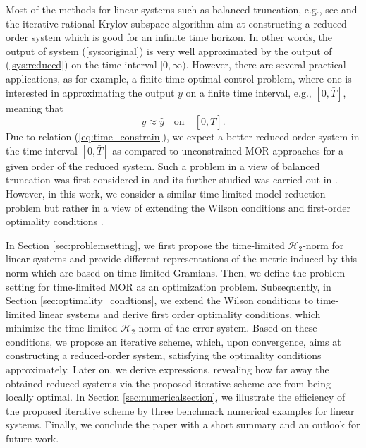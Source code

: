 \documentclass[a4paper,11pt, twoside]{article}
\begin{document}
Most of the methods for linear systems such as balanced truncation, e.g., see \cite{morAnt05, morMoo81} and the iterative rational Krylov subspace 
algorithm \cite{morGugAB08} aim at constructing a reduced-order system which is good for an infinite time horizon. In other words, the output 
of system (\ref{sys:original}) is very well approximated by the output of (\ref{sys:reduced}) on the time interval $[0,\infty)$. 
However, there are several practical applications, as for example, a 
finite-time optimal control problem, where one is interested in approximating the output $y$ on a finite time interval, e.g., $[0,\bar T]$, meaning 
that \begin{equation}\label{eq:time_constrain}
y \approx \hat y\quad \text{on} \quad [0,\bar T].
\end{equation}
Due to relation (\ref{eq:time_constrain}), we expect a better reduced-order system in the time interval $[0,\bar T]$ as compared to unconstrained MOR 
approaches for a given order of the reduced system. Such a problem in a view of balanced truncation was 
first considered in \cite{morGawJ90} and its further studied was carried out in \cite{morK17, redmannkuerschner}. However, in this work, we consider 
a similar time-limited model reduction problem but rather in a view of extending the Wilson conditions \cite{wilson1970optimum} and 
 first-order optimality conditions \cite{morGugAB08,  meier1967approximation, wilson1970optimum}. \smallskip 

In Section \ref{sec:problemsetting}, we first propose the time-limited $\mathcal  H_2$-norm for linear systems 
and provide different representations of the metric induced by this norm which are based on time-limited Gramians. Then, 
we define the problem setting for time-limited MOR as an optimization problem. Subsequently, in Section \ref{sec:optimality_condtions}, we extend the 
Wilson conditions to time-limited linear systems and derive  first order optimality conditions, which 
minimize the time-limited $\mathcal H_2$-norm of the error system. Based on these conditions, we propose an iterative scheme, which, upon 
convergence, aims at constructing a reduced-order system, satisfying the optimality conditions approximately. Later on, we derive expressions, 
revealing how far away the obtained reduced systems via the proposed iterative scheme are from being locally optimal. In Section 
\ref{sec:numericalsection}, we illustrate the efficiency of the proposed iterative scheme by three benchmark numerical examples for linear systems. 
Finally, we conclude the paper with a short summary and an outlook for future work. 
\end{document}
